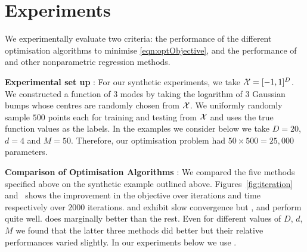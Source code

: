 
\section{Experiments}
\label{sec:experiments}

\vspace{-0.1in}
We experimentally evaluate two criteria: the
performance of the different optimisation algorithms to minimise 
\eqref{eqn:optObjective}, and the performance of \addkrrs and other
nonparametric regression methods. 

\textbf{Experimental set up} :
For our synthetic experiments, we take $\mathcal{X} = [-1, 1]^D$.
We constructed a function of $3$ modes by taking the logarithm of $3$
Gaussian bumps whose centres are randomly chosen from $\mathcal{X}$.
We uniformly randomly sample $500$ points each for training and testing from
$\mathcal{X}$ and uses the true function values as the labels.
In the examples we consider below we take $D = 20$, $d = 4$ and $M = 50$. 
Therefore, our optimisation problem had $50 \times 500 = 25,000$ parameters.


\textbf{Comparison of Optimisation Algorithms} :
We compared the five methods specified above on the synthetic example outlined
above. Figures~\ref{fig:iteration} and~ shows the improvement
in the objective over iterations and time respectively over $2000$ iterations. 
\subgrad and \proxgrad exhibit slow convergence but
\proxgradaccn, \bcdexact and \bcgddiag perform quite well. 
\proxgradaccn does marginally better than the rest.
Even for different values of $D$, $d$, $M$  we found that the latter three
methods did better but their relative performances varied slightly.
In our experiments below we use \proxgradaccn.

